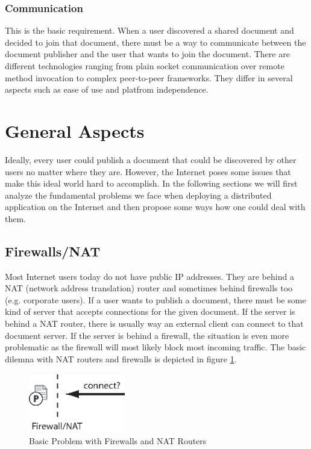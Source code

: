 \documentclass[11pt,a4paper]{article}
\begin{document}
\subsubsection{Communication}
This is the basic requirement. When a user discovered a shared document and decided to join that document, there must be a way to communicate between the document publisher and the user that wants to join the document. There are different technologies ranging from plain socket communication over remote method invocation to complex peer-to-peer frameworks. They differ in several aspects such as ease of use and platfrom independence.



\section{General Aspects}
Ideally, every user could publish a document that could be discovered by other users no matter where they are. However, the Internet poses some issues that make this ideal world hard to accomplish. In the following sections we will first analyze the fundamental problems we face when deploying a distributed application on the Internet and then propose some ways how one could deal with them.

\subsection{Firewalls/NAT}
Most Internet users today do not have public IP addresses. They are behind a NAT (network address translation) router and sometimes behind firewalls too (e.g. corporate users). If a user wants to publish a document, there must be some kind of server that accepts connections for the given document. If the server is behind a NAT router, there is usually way an external client can connect to that document server. If the server is behind a firewall, the situation is even more problematic as the firewall will most likely block most incoming traffic. The basic dilemna with NAT routers and firewalls is depicted in figure \ref{fig:firewall}.

\begin{figure}[H]
 \centering
 \includegraphics[width=4.2cm,height=2.6cm]{../../images/net_firewall.eps}
 \caption{Basic Problem with Firewalls and NAT Routers}
 \label{fig:firewall}
\end{figure}
\end{document}
